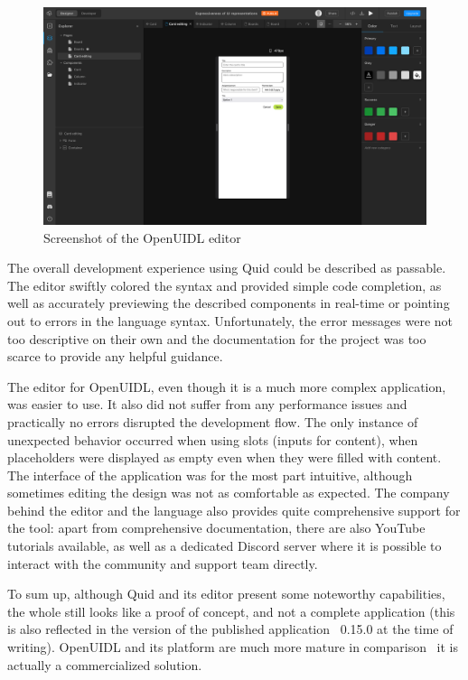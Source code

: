 \begin{figure}
    \centering
    \includegraphics[width=\textwidth]{4-results-and-discussion/openuidl-editor}
    \caption{Screenshot of the OpenUIDL editor}
    \label{fig:4-2-openuidl-editor}
\end{figure}

The overall development experience using Quid could be described as passable.
The editor swiftly colored the syntax and provided simple code completion, as well as accurately previewing the described components in real-time or pointing out to errors in the language syntax.
Unfortunately, the error messages were not too descriptive on their own and the documentation for the project was too scarce to provide any helpful guidance.

The editor for OpenUIDL, even though it is a much more complex application, was easier to use.
It also did not suffer from any performance issues and practically no errors disrupted the development flow.
The only instance of unexpected behavior occurred when using slots (inputs for content), when placeholders were displayed as empty even when they were filled with content.
The interface of the application was for the most part intuitive, although sometimes editing the design was not as comfortable as expected. %
The company behind the editor and the language also provides quite comprehensive support for the tool: apart from comprehensive documentation, there are also YouTube tutorials available, as well as a dedicated Discord server where it is possible to interact with the community and support team directly.

To sum up, although Quid and its editor present some noteworthy capabilities, the whole still looks like a proof of concept, and not a complete application (this is also reflected in the version of the published application \textendash\ 0.15.0 at the time of writing).
OpenUIDL and its platform are much more mature in comparison \textendash\ it is actually a commercialized solution. %
